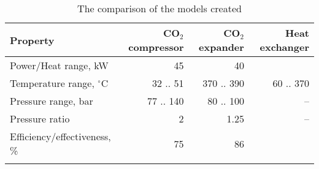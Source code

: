 \begin{table}
\label{tab:DiscussionComparison}
\caption{The comparison of the models created}
\begin{center}
\begin{tabulary}{0.9\textwidth}{LRRR}
\toprule
Property    	                &	CO$_2$ compressor   & CO$_2$	expander    & Heat exchanger    \\
\midrule
Power/Heat range, kW            &       45              &       40              &                   \\
Temperature range, $^\circ$C    &    32 .. 51           &      370 .. 390       &   60 .. 370       \\
Pressure range, bar             &   77 .. 140           &     80 .. 100         &      --           \\
Pressure ratio                  &   2                   &        1.25           &      --           \\
Efficiency/effectiveness, \%    &      75               &         86            &                   \\
& & & \\
\bottomrule
\end{tabulary}
\end{center}
\end{table}